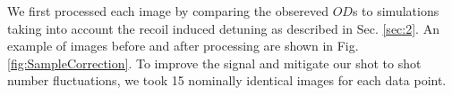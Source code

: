 \documentclass[12pt]{iopart}
\begin{document}
We first processed each image by comparing the obsereved $OD$s to simulations taking into account the recoil induced detuning as described in Sec. \ref{sec:2}. An example of images before and after processing are shown in Fig. \ref{fig:SampleCorrection}.  To improve the signal and mitigate our shot to shot number fluctuations, we took 15 nominally identical images for each data point.
\begin{figure}

\end{figure}
\end{document}
